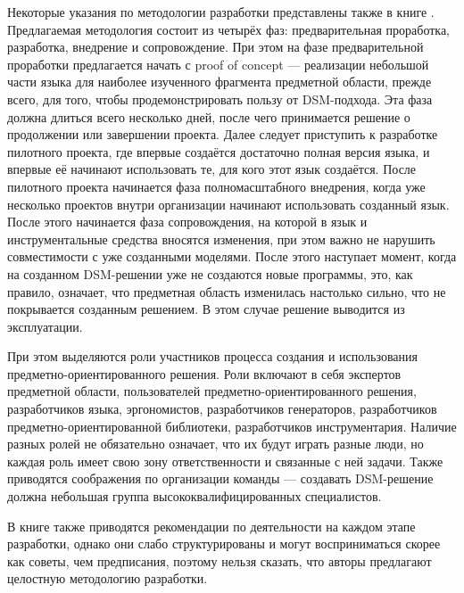 Некоторые указания по методологии разработки представлены также в книге \cite{kelly2008domain}. 
Предлагаемая методология состоит из четырёх фаз: предварительная проработка, разработка, 
внедрение и сопровождение. При этом на фазе предварительной проработки предлагается начать с
proof of concept --- реализации небольшой части языка для наиболее изученного фрагмента 
предметной области, прежде всего, для того, чтобы продемонстрировать пользу от DSM-подхода. 
Эта фаза должна длиться всего несколько дней, после чего принимается решение о продолжении 
или завершении проекта. Далее следует приступить к разработке пилотного проекта, где 
впервые создаётся достаточно полная версия языка, и впервые её начинают использовать 
те, для кого этот язык создаётся. После пилотного проекта начинается фаза полномасштабного 
внедрения, когда уже несколько проектов внутри организации начинают использовать созданный 
язык. После этого начинается фаза сопровождения, на которой в язык и инструментальные 
средства вносятся изменения, при этом важно не нарушить совместимости с уже созданными 
моделями. После этого наступает момент, когда на созданном DSM-решении уже не создаются 
новые программы, это, как правило, означает, что предметная область изменилась настолько 
сильно, что не покрывается созданным решением. В этом случае решение выводится из эксплуатации.

При этом выделяются роли участников процесса создания и использования предметно-ориентированного 
решения. Роли включают в себя экспертов предметной области, пользователей предметно-ориентированного 
решения, разработчиков языка, эргономистов, разработчиков генераторов, разработчиков 
предметно-ориентированной библиотеки, разработчиков инструментария. Наличие разных 
ролей не обязательно означает, что их будут играть разные люди, но каждая роль имеет свою зону 
ответственности и связанные с ней задачи. Также приводятся соображения по организации команды 
--- создавать DSM-решение должна небольшая группа высококвалифицированных специалистов.

В книге также приводятся рекомендации по деятельности на каждом этапе разработки, однако 
они слабо структурированы и могут восприниматься скорее как советы, чем предписания, 
поэтому нельзя сказать, что авторы предлагают целостную методологию разработки.

